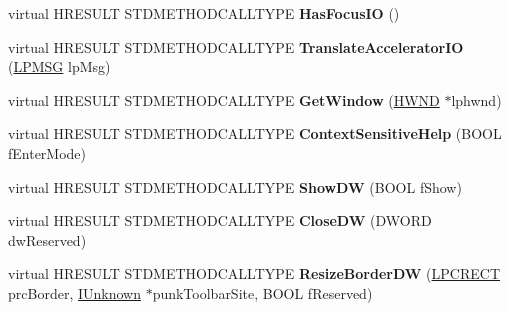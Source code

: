 \begin{DoxyCompactItemize}
\item 
\mbox{\label{class_c_internet_toolbar_ad73bf0ffa7ea3dbfe31dd4a1bd5a71fc}} 
virtual H\+R\+E\+S\+U\+LT S\+T\+D\+M\+E\+T\+H\+O\+D\+C\+A\+L\+L\+T\+Y\+PE {\bfseries Has\+Focus\+IO} ()
\item 
\mbox{\label{class_c_internet_toolbar_ae3e33176205459db096c277ddf22b6ab}} 
virtual H\+R\+E\+S\+U\+LT S\+T\+D\+M\+E\+T\+H\+O\+D\+C\+A\+L\+L\+T\+Y\+PE {\bfseries Translate\+Accelerator\+IO} (\hyperlink{structtag_m_s_g}{L\+P\+M\+SG} lp\+Msg)
\item 
\mbox{\label{class_c_internet_toolbar_a0d662e845e76c15c288554265bb3b0c2}} 
virtual H\+R\+E\+S\+U\+LT S\+T\+D\+M\+E\+T\+H\+O\+D\+C\+A\+L\+L\+T\+Y\+PE {\bfseries Get\+Window} (\hyperlink{interfacevoid}{H\+W\+ND} $\ast$lphwnd)
\item 
\mbox{\label{class_c_internet_toolbar_acc822b090173293de8db0e334aa0dd29}} 
virtual H\+R\+E\+S\+U\+LT S\+T\+D\+M\+E\+T\+H\+O\+D\+C\+A\+L\+L\+T\+Y\+PE {\bfseries Context\+Sensitive\+Help} (B\+O\+OL f\+Enter\+Mode)
\item 
\mbox{\label{class_c_internet_toolbar_aae24ab17925b257aeb03bbc2b1e686f0}} 
virtual H\+R\+E\+S\+U\+LT S\+T\+D\+M\+E\+T\+H\+O\+D\+C\+A\+L\+L\+T\+Y\+PE {\bfseries Show\+DW} (B\+O\+OL f\+Show)
\item 
\mbox{\label{class_c_internet_toolbar_aef45004fd8a858a382320bdc5e237783}} 
virtual H\+R\+E\+S\+U\+LT S\+T\+D\+M\+E\+T\+H\+O\+D\+C\+A\+L\+L\+T\+Y\+PE {\bfseries Close\+DW} (D\+W\+O\+RD dw\+Reserved)
\item 
\mbox{\label{class_c_internet_toolbar_a4315722401bec6b579d67d71bb76d1bf}} 
virtual H\+R\+E\+S\+U\+LT S\+T\+D\+M\+E\+T\+H\+O\+D\+C\+A\+L\+L\+T\+Y\+PE {\bfseries Resize\+Border\+DW} (\hyperlink{structtag_r_e_c_t}{L\+P\+C\+R\+E\+CT} prc\+Border, \hyperlink{interface_i_unknown}{I\+Unknown} $\ast$punk\+Toolbar\+Site, B\+O\+OL f\+Reserved)
\item 
\mbox{\label{class_c_internet_toolbar_a259c779a34cc80a9a215a475c5fba1c0}} 

\end{DoxyCompactItemize}
